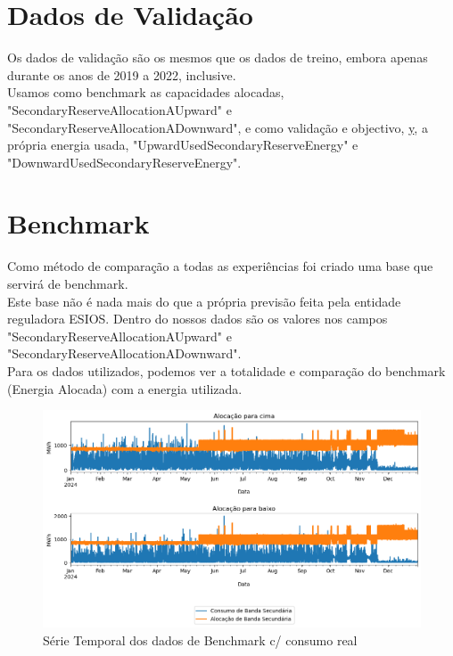 \section{Dados de Validação}
Os dados de validação são os mesmos que os dados de treino, embora apenas durante os anos de 2019 a 2022, inclusive.\\
Usamos como benchmark as capacidades alocadas, "SecondaryReserveAllocationAUpward" e "SecondaryReserveAllocationADownward", e como validação e objectivo, \hyperref[se:metneuralnet]{y}, a própria energia usada, "UpwardUsedSecondaryReserveEnergy" e "DownwardUsedSecondaryReserveEnergy".

\section{Benchmark}

Como método de comparação a todas as experiências foi criado uma base que servirá de benchmark.\\
Este base não é nada mais do que a própria previsão feita pela entidade reguladora ESIOS. Dentro do nossos dados são os valores nos campos "SecondaryReserveAllocationAUpward" e "SecondaryReserveAllocationADownward".\\
Para os dados utilizados, podemos ver a totalidade e comparação do benchmark (Energia Alocada) com a energia utilizada.\\

\begin{figure}[H]
    \centering
    \includegraphics[width=\textwidth]{plots/benchmark_alocacoes_validacao.png}
    \caption{Série Temporal dos dados de Benchmark c/ consumo real}
    \label{fig:benchmarktimeseries}
\end{figure}

